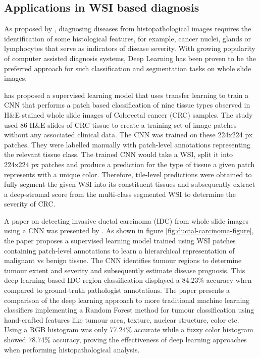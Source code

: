 \documentclass{l4proj}
\begin{document}
\subsection{Applications in WSI based diagnosis} \label{dl-application-background}
As proposed by \cite{gurcan2009histopathological}, diagnosing diseases from histopathological images requires the identification of some histological features, for example, cancer nuclei, glands or lymphocytes that serve as indicators of disease severity. With growing popularity of computer assisted diagnosis systems, Deep Learning has been proven to be the preferred approach for such classification and segmentation tasks on whole slide images. 

\cite{Kather2019} has proposed a supervised learning model that uses transfer learning to train a CNN that performs a patch based classification of nine tissue types observed in H\&E stained whole slide images of Colorectal cancer (CRC) samples. The study used 86 H\&E slides of CRC tissue to create a training set of image patches without any associated clinical data. The CNN was trained on these 224x224 px patches. They were labelled manually with patch-level annotations representing the relevant tissue class. The trained CNN would take a WSI, split it into 224x224 px patches and produce a prediction for the type of tissue a given patch represents with a unique color. Therefore, tile-level predictions were obtained to fully segment the given WSI into its constituent tissues and subsequently extract a deep-stromal score from the multi-class segmented WSI to determine the severity of CRC. 

A paper on detecting invasive ductal carcinoma (IDC) from whole slide images using a CNN was presented by \cite{cruz2014automatic}. As shown in figure \ref{fig:ductal-carcinoma-figure}, the paper proposes a supervised learning model trained using WSI patches containing patch-level annotations to learn a hierarchical  representation of malignant vs benign tissue. The CNN identifies tumour regions to determine tumour extent and severity and subsequently estimate disease prognosis. This deep learning based IDC region classification displayed a 84.23\% accuracy when compared to ground-truth pathologist annotations. The paper presents a comparison of the deep learning approach to more traditional machine learning classifiers implementing a Random Forest method for tumour classification using hand-crafted features like tumour area, texture, nuclear structure, color etc. Using a RGB histogram was only 77.24\% accurate while a fuzzy color histogram showed 78.74\% accuracy, proving the effectiveness of deep learning approaches when performing histopathological analysis. 
\end{document}
